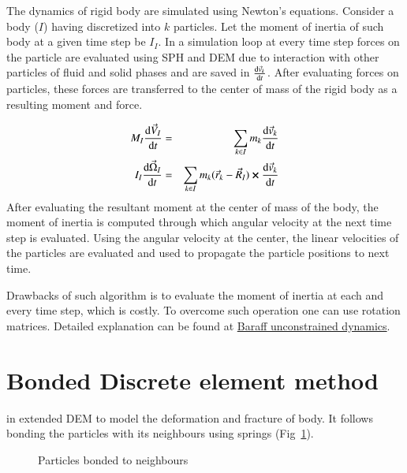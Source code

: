 The dynamics of rigid body are simulated using Newton's equations. Consider a
body ($I$) having discretized into $k$ particles. Let the moment of inertia of
such body at a given time step be $I_I$. In a simulation loop at every time step
forces on the particle are evaluated using SPH and DEM due to interaction with
other particles of fluid and solid phases and are saved in $\dv{\vec{v}_k}{t}$.
After evaluating forces on particles, these forces are transferred to the center
of mass of the rigid body as a resulting moment and force.

\begin{eqnarray}
  \label{eq:rigid_body_newton_equation}
  M_I \dv{\vec{V}_I}{t} &=& \sum_{k \in I} m_k \dv{\vec{v}_k}{t}\\
  I_I \dv{\vec{\Omega}_I}{t} &=& \sum_{k \in I} m_k (\vec{r}_k - \vec{R}_I) \cross \dv{\vec{v}_k}{t}
\end{eqnarray}
After evaluating the resultant moment at the center of mass of the body, the
moment of inertia is computed through which angular velocity at the next time
step is evaluated. Using the angular velocity at the center, the linear
velocities of the particles are evaluated and used to propagate the particle
positions to next time.


Drawbacks of such algorithm is to evaluate the moment of inertia at each and
every time step, which is costly. To overcome such operation one can use
rotation matrices. Detailed explanation can be found at
\href{https://www.cs.cmu.edu/~baraff/sigcourse/notesd1.pdf}{Baraff unconstrained
  dynamics}.

\section{Bonded Discrete element method}
\label{sec:bond-discr-elem}

\citeauthor*{Potyondy_2004} in extended DEM to model the deformation and
fracture of body. It follows bonding the particles with its neighbours using
springs (Fig~\ref{fig:bonded_dem}).


\begin{figure}
  \centering
  \caption{Particles bonded to neighbours}
  \label{fig:bonded_dem}
\end{figure}



